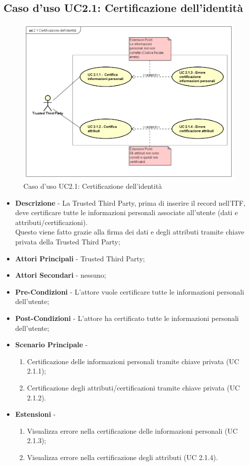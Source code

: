 \subsection{Caso d'uso UC2.1: Certificazione dell'identità}
\begin{figure}[h]
	\centering
	\includegraphics[scale=0.50]{immagini/usecase/UC21_CertificazioneIdentita}
	\caption{Caso d'uso UC2.1: Certificazione dell'identità}
\end{figure}
\begin{itemize}
	\item \textbf{Descrizione} - La Trusted Third Party, prima di inserire il record nell'ITF, deve certificare tutte le informazioni personali associate all'utente (dati e attributi/certificazioni).\\
	Questo viene fatto grazie alla firma dei dati e degli attributi tramite chiave privata della Trusted Third Party;
	\item \textbf{Attori Principali} - Trusted Third Party;
	\item \textbf{Attori Secondari} - nessuno;
	\item \textbf{Pre-Condizioni} - L'attore vuole certificare tutte le informazioni personali dell'utente;
	\item \textbf{Post-Condizioni} - L'attore ha certificato tutte le informazioni personali dell'utente;
	\item \textbf{Scenario Principale} -
	\begin{enumerate}
		\item Certificazione delle informazioni personali tramite chiave privata (UC 2.1.1);
		\item Certificazione degli attributi/certificazioni tramite chiave privata (UC 2.1.2).
	\end{enumerate}
	\item \textbf{Estensioni} -
	\begin{enumerate}
		\item Visualizza errore nella certificazione delle informazioni personali (UC 2.1.3);
		\item Visualizza errore nella certificazione degli attributi (UC 2.1.4).
	\end{enumerate}
\end{itemize}
